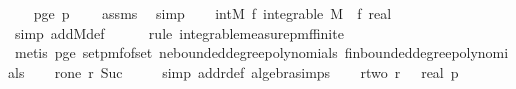 \begin{isabellebody}
\isanewline
\ \ \isamarkupfalse%
\ p{\isacharunderscore}{\kern0pt}ge{\isacharunderscore}{\kern0pt}{}{\isacharcolon}{\kern0pt}\ {\isachardoublequoteopen}p\ {\isachargreater}{\kern0pt}\ {}{\isachardoublequoteclose}\ \isamarkupfalse%
\ assms{\isacharparenleft}{\kern0pt}{}{\isacharparenright}{\kern0pt}\ \isamarkupfalse%
\ simp\isanewline
\isanewline
\ \ \isamarkupfalse%
\ int{\isacharunderscore}{\kern0pt}M{\isacharcolon}{\kern0pt}\ {\isachardoublequoteopen}{\isasymAnd}f{\isachardot}{\kern0pt}\ integrable\ M\ {\isacharparenleft}{\kern0pt}{\isasymlambda}{\isasymomega}{\isachardot}{\kern0pt}\ {\isacharparenleft}{\kern0pt}{\isacharparenleft}{\kern0pt}f\ {\isasymomega}{\isacharparenright}{\kern0pt}{\isacharcolon}{\kern0pt}{\isacharcolon}{\kern0pt}real{\isacharparenright}{\kern0pt}{\isacharparenright}{\kern0pt}{\isachardoublequoteclose}\isanewline
\ \ \ \ \isamarkupfalse%
\ {\isacharparenleft}{\kern0pt}simp\ add{\isacharcolon}{\kern0pt}M{\isacharunderscore}{\kern0pt}def{\isacharparenright}{\kern0pt}\isanewline
\ \ \ \ \isamarkupfalse%
\ {\isacharparenleft}{\kern0pt}rule\ integrable{\isacharunderscore}{\kern0pt}measure{\isacharunderscore}{\kern0pt}pmf{\isacharunderscore}{\kern0pt}finite{\isacharparenright}{\kern0pt}\isanewline
\ \ \ \ \isamarkupfalse%
\ {\isacharparenleft}{\kern0pt}metis\ p{\isacharunderscore}{\kern0pt}ge{\isacharunderscore}{\kern0pt}{}\ set{\isacharunderscore}{\kern0pt}pmf{\isacharunderscore}{\kern0pt}of{\isacharunderscore}{\kern0pt}set\ ne{\isacharunderscore}{\kern0pt}bounded{\isacharunderscore}{\kern0pt}degree{\isacharunderscore}{\kern0pt}polynomials\ fin{\isacharunderscore}{\kern0pt}bounded{\isacharunderscore}{\kern0pt}degree{\isacharunderscore}{\kern0pt}polynomials{\isacharparenright}{\kern0pt}\isanewline
\isanewline
\ \ \isamarkupfalse%
\ r{\isacharunderscore}{\kern0pt}one{\isacharcolon}{\kern0pt}\ {\isachardoublequoteopen}r\ {\isacharparenleft}{\kern0pt}Suc\ {}{\isacharparenright}{\kern0pt}\ {\isacharequal}{\kern0pt}\ {}{\isachardoublequoteclose}\ \isamarkupfalse%
\ {\isacharparenleft}{\kern0pt}simp\ add{\isacharcolon}{\kern0pt}r{\isacharunderscore}{\kern0pt}def\ algebra{\isacharunderscore}{\kern0pt}simps{\isacharparenright}{\kern0pt}\isanewline
\isanewline
\ \ \isamarkupfalse%
\ r{\isacharunderscore}{\kern0pt}two{\isacharcolon}{\kern0pt}\ {\isachardoublequoteopen}r\ {}\ {\isacharequal}{\kern0pt}\ {\isacharparenleft}{\kern0pt}real\ p{\isacharcircum}{\kern0pt}{}{\isacharminus}{\kern0pt}{}{\isacharparenright}{\kern0pt}{\isachardoublequoteclose}\isanewline

\end{isabellebody}
